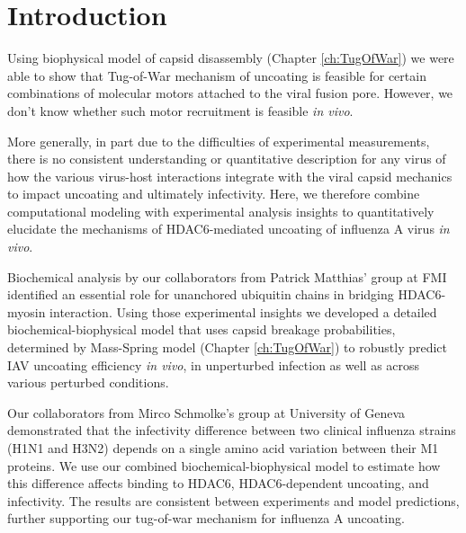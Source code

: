 \section{Introduction}

Using biophysical model of capsid disassembly (Chapter \ref{ch:TugOfWar}) we were able to show that Tug-of-War mechanism of uncoating is feasible for certain combinations of molecular motors attached to the viral fusion pore. However, we don't know whether such motor recruitment is feasible \textit{in vivo}.

More generally, in part due to the difficulties of experimental measurements, there is no consistent understanding or quantitative description for any virus of how the various virus-host interactions integrate with the viral capsid mechanics to impact uncoating and ultimately infectivity. Here, we therefore combine computational modeling with experimental analysis insights to quantitatively elucidate the mechanisms of HDAC6-mediated uncoating of influenza A virus \textit{in vivo}. 

Biochemical analysis by our collaborators from Patrick Matthias' group at FMI identified an essential role for unanchored ubiquitin chains in bridging HDAC6-myosin interaction. Using those experimental insights we developed a detailed biochemical-biophysical model that uses capsid breakage probabilities, determined by Mass-Spring model (Chapter \ref{ch:TugOfWar}) to robustly predict IAV uncoating efficiency \textit{in vivo}, in unperturbed infection as well as across various perturbed conditions.

Our collaborators from Mirco Schmolke's group at University of Geneva demonstrated that the infectivity difference between two clinical influenza strains (H1N1 and H3N2) depends on a single amino acid variation between their M1 proteins. We use our combined biochemical-biophysical model to estimate how this difference affects binding to HDAC6, HDAC6-dependent uncoating, and infectivity. The results are consistent between experiments and model predictions, further supporting our tug-of-war mechanism for influenza A uncoating.